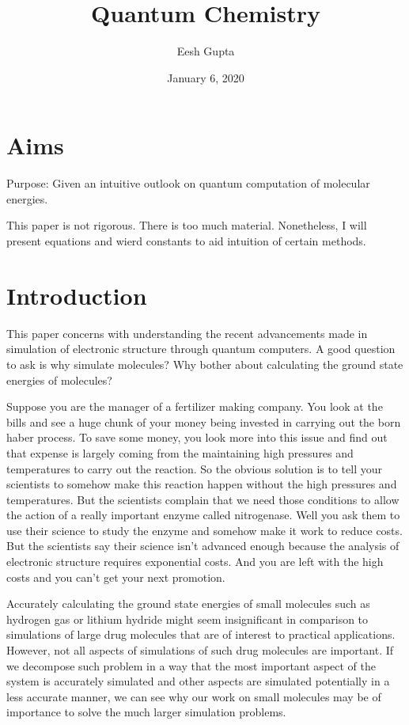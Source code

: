 \documentclass{article}
\title{Quantum Chemistry}
\author{Eesh Gupta }
\date{January 6, 2020}
\begin{document}
\maketitle
\tableofcontents
\newpage

\section{Aims}
Purpose: Given an intuitive outlook on quantum computation of molecular
energies.

This paper is not rigorous. There is too much material. Nonetheless, I
will present equations and wierd constants to aid intuition of certain
methods.

\section{Introduction}
This paper concerns with understanding the recent advancements made in
simulation of electronic structure through quantum computers. A good
question to ask is why simulate molecules? Why bother about calculating
the ground state energies of molecules?

Suppose you are the manager of a fertilizer making company. You look at the
bills and see a huge chunk of your money being invested in carrying out the
born haber process. To save some money, you look more into this issue and
find out that expense is largely coming from the maintaining high pressures
and temperatures to carry out the reaction. So the obvious solution is to
tell your scientists to somehow make this reaction happen without the high
pressures and temperatures. But the scientists complain that we need those
conditions to allow the action of a really important enzyme called
nitrogenase. Well you ask them to use their science to study the enzyme and
somehow make it work to reduce costs. But the scientists say their science
isn't advanced enough because the analysis of electronic structure requires
exponential costs. And you are left with the high costs and you can't get
your next promotion.

Accurately calculating the ground state energies of small molecules such as
hydrogen gas or lithium hydride might seem insignificant in comparison to
simulations of large drug molecules that are of interest to practical
applications. However, not all aspects of simulations of such drug molecules
 are important. If we decompose such problem in a way that the most important
 aspect of the system is accurately simulated and other aspects are simulated
 potentially in a less accurate manner, we can see why our work on small
 molecules may be of importance to solve the much larger simulation problems.
\end{document}
